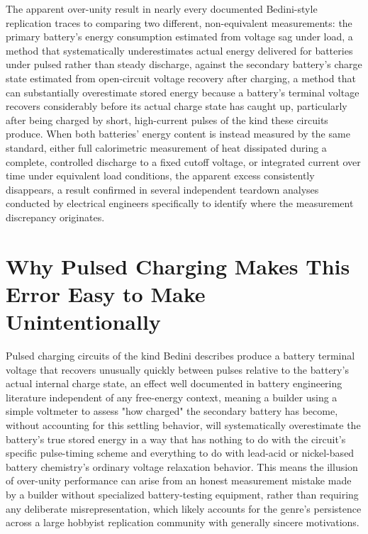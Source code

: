 \documentclass[11pt]{article}
\begin{document}
The apparent over-unity result in nearly every documented Bedini-style replication traces to comparing two different, non-equivalent measurements: the primary battery's energy consumption estimated from voltage sag under load, a method that systematically underestimates actual energy delivered for batteries under pulsed rather than steady discharge, against the secondary battery's charge state estimated from open-circuit voltage recovery after charging, a method that can substantially overestimate stored energy because a battery's terminal voltage recovers considerably before its actual charge state has caught up, particularly after being charged by short, high-current pulses of the kind these circuits produce. When both batteries' energy content is instead measured by the same standard, either full calorimetric measurement of heat dissipated during a complete, controlled discharge to a fixed cutoff voltage, or integrated current over time under equivalent load conditions, the apparent excess consistently disappears, a result confirmed in several independent teardown analyses conducted by electrical engineers specifically to identify where the measurement discrepancy originates.

\section{Why Pulsed Charging Makes This Error Easy to Make Unintentionally}

Pulsed charging circuits of the kind Bedini describes produce a battery terminal voltage that recovers unusually quickly between pulses relative to the battery's actual internal charge state, an effect well documented in battery engineering literature independent of any free-energy context, meaning a builder using a simple voltmeter to assess "how charged" the secondary battery has become, without accounting for this settling behavior, will systematically overestimate the battery's true stored energy in a way that has nothing to do with the circuit's specific pulse-timing scheme and everything to do with lead-acid or nickel-based battery chemistry's ordinary voltage relaxation behavior. This means the illusion of over-unity performance can arise from an honest measurement mistake made by a builder without specialized battery-testing equipment, rather than requiring any deliberate misrepresentation, which likely accounts for the genre's persistence across a large hobbyist replication community with generally sincere motivations.
\end{document}
